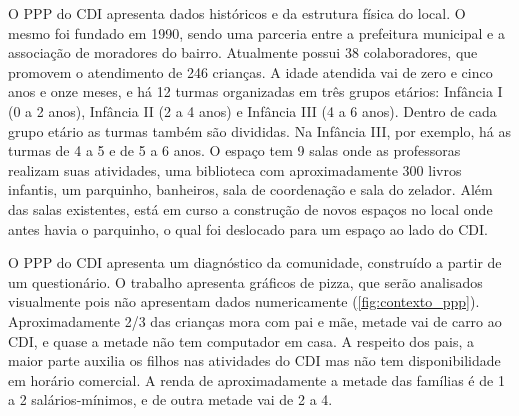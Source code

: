 O \ac{PPP} do \ac{CDI} apresenta dados históricos e da estrutura física do local. O mesmo foi fundado em 1990, sendo uma parceria entre a prefeitura municipal e a associação de moradores do bairro. Atualmente possui 38 colaboradores, que promovem o atendimento de 246 crianças. A idade atendida vai de zero e cinco anos e onze meses, e há 12 turmas organizadas em três grupos etários: Infância I (0 a 2 anos), Infância II (2 a 4 anos) e Infância III (4 a 6 anos). Dentro de cada grupo etário as turmas também são divididas. Na Infância III, por exemplo, há as turmas de 4 a 5 e de 5 a 6 anos. O espaço tem 9 salas onde as professoras realizam suas atividades, uma biblioteca com aproximadamente 300 livros infantis, um parquinho, banheiros, sala de coordenação e sala do zelador. Além das salas existentes, está em curso a construção de novos espaços no local onde antes havia o parquinho, o qual foi deslocado para um espaço ao lado do CDI. 

O \ac{PPP} do \ac{CDI} apresenta um diagnóstico da comunidade, construído a partir de um questionário. O trabalho apresenta gráficos de pizza, que serão analisados visualmente pois não apresentam dados numericamente (\autoref{fig:contexto_ppp}). Aproximadamente 2/3 das crianças mora com pai e mãe, metade vai de carro ao \ac{CDI}, e quase a metade não tem computador em casa. A respeito dos pais, a maior parte auxilia os filhos nas atividades do \ac{CDI} mas não tem disponibilidade em horário comercial. A renda de aproximadamente a metade das famílias é de 1 a 2 salários-mínimos, e de outra metade vai de 2 a 4.

